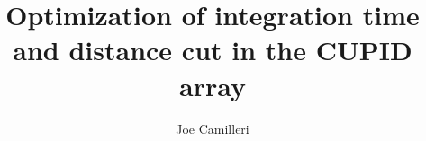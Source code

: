\documentclass{beamer}
\title[CUPID array]{Optimization of integration time and distance cut in the CUPID array} %
\author{Joe Camilleri} %
\institute[Virginia Tech] %
{
	Virginia Tech \\ %
	\medskip
	DNP October 2021 \\
	\medskip
	\textbf{Mini-Symposium: Neutrinos and Nuclei XII: Double Beta Decay Analysis Techniques}
}
\date{} %
\begin{document}
	\begin{frame}
		\titlepage %
	\end{frame}
	
	
	
	
%			
%			
%			
	
\end{document}

